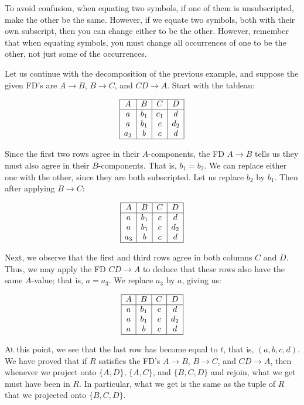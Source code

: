   To avoid confusion, when equating two symbols, if one of them is unsubscripted, make the other be the same. However, if we equate two symbols, both with their own subscript, then you can change either to be the other. However, remember that when equating symbols, you must change all occurrences of one to be the other, not just some of the occurrences.

  \begin{example}
    Let us continue with the decomposition of the previous example, and suppose the given FD's are $A \rightarrow B$, $B \rightarrow C$, and $CD \rightarrow A$. Start with the tableau:

    \[
    \begin{array}{|c|c|c|c|}
    \hline
    A & B & C & D \\
    \hline
    a & b_1 & c_1 & d \\
    a & b_1 & c & d_2 \\
    a_3 & b & c & d \\
    \hline
    \end{array}
    \]

    Since the first two rows agree in their $A$-components, the FD $A \rightarrow B$ tells us they must also agree in their $B$-components. That is, $b_1 = b_2$. We can replace either one with the other, since they are both subscripted. Let us replace $b_2$ by $b_1$. Then after applying $B \rightarrow C$:

    \[
    \begin{array}{|c|c|c|c|}
    \hline
    A & B & C & D \\
    \hline
    a & b_1 & c & d \\
    a & b_1 & c & d_2 \\
    a_3 & b & c & d \\
    \hline
    \end{array}
    \]

    Next, we observe that the first and third rows agree in both columns $C$ and $D$. Thus, we may apply the FD $CD \rightarrow A$ to deduce that these rows also have the same $A$-value; that is, $a = a_3$. We replace $a_3$ by $a$, giving us:

    \[
    \begin{array}{|c|c|c|c|}
    \hline
    A & B & C & D \\
    \hline
    a & b_1 & c & d \\
    a & b_1 & c & d_2 \\
    a & b & c & d \\
    \hline
    \end{array}
    \]

    At this point, we see that the last row has become equal to $t$, that is, $(a,b,c,d)$. We have proved that if $R$ satisfies the FD's $A \rightarrow B$, $B \rightarrow C$, and $CD \rightarrow A$, then whenever we project onto $\{A,D\}$, $\{A,C\}$, and $\{B,C,D\}$ and rejoin, what we get must have been in $R$. In particular, what we get is the same as the tuple of $R$ that we projected onto $\{B,C,D\}$.
  \end{example}

